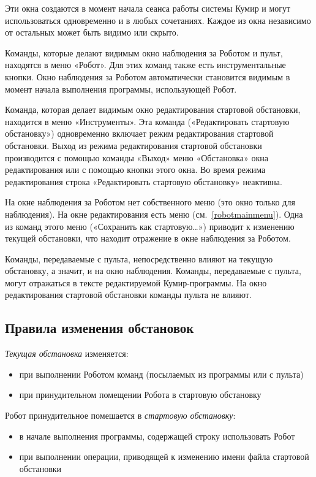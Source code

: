 \documentclass[12pt,a4paper]{article}
\begin{document}
Эти окна создаются в момент начала сеанса работы системы Кумир и могут использоваться одновременно и в любых сочетаниях. Каждое из окна независимо от остальных может быть видимо или скрыто.

Команды, которые делают видимым окно наблюдения за Роботом и пульт, находятся в меню «Робот». Для этих команд также есть инструментальные кнопки. Окно наблюдения за Роботом автоматически становится видимым в момент начала выполнения программы, использующей Робот.

Команда, которая делает видимым окно редактирования стартовой обстановки, находится в меню «Инструменты». Эта команда («Редактировать стартовую обстановку») одновременно включает режим редактирования стартовой обстановки. Выход из режима редактирования стартовой обстановки производится с помощью команды «Выход» меню «Обстановка» окна редактирования или с помощью кнопки этого окна. Во время режима редактирования строка «Редактировать стартовую обстановку» неактивна.

На окне наблюдения за Роботом нет собственного меню (это окно только для наблюдения). На окне редактирования есть меню (см.~\ref{robotmainmenu}). Одна из команд этого меню («Сохранить как стартовую\dots») приводит к изменению текущей обстановки, что находит отражение в окне наблюдения за Роботом. 

Команды, передаваемые с пульта, непосредственно влияют на текущую обстановку, а значит, и на окно наблюдения. Команды, передаваемые с пульта, могут отражаться в тексте редактируемой Кумир-программы. На окно редактирования стартовой обстановки команды пульта не влияют.

\subsection{Правила изменения обстановок}

\emph{Текущая обстановка} изменяется:
\begin{itemize}
\item при выполнении Роботом команд (посылаемых из программы или с пульта)
\item при принудительном помещении Робота в стартовую обстановку
\end{itemize}

Робот принудительное помешается в \emph{стартовую обстановку}:
\begin{itemize}
\item в начале выполнения программы, содержащей строку \textsf{использовать Робот}
\item при выполнении операции, приводящей к изменению имени файла стартовой обстановки
\end{itemize}
\end{document}
